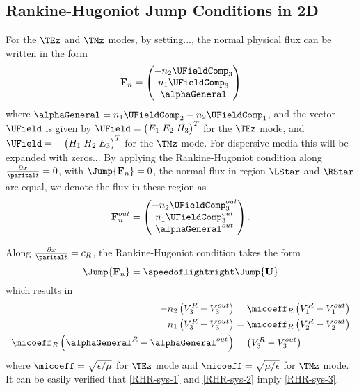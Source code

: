 \subsection{Rankine-Hugoniot Jump Conditions in 2D}
For the $\TEz$ and $\TMz$ modes, by setting..., the normal physical flux can be
written in the form
$$
\mathbf{F}_n = 
\begin{pmatrix}
  - n_2 \UFieldComp_3 \\
  n_1 \UFieldComp_3 \\
  \alphaGeneral
\end{pmatrix}
$$
where $ \alphaGeneral = n_1 \UFieldComp_2 - n_2 \UFieldComp_1 $, and the vector $\UField$ is given by $
\UField = 
  \begin{pmatrix} 
    E_1 \; E_2 \; H_3
  \end{pmatrix}^T
$ for the $\TEz$ mode, and $
\UField = 
  -
  \begin{pmatrix} 
    H_1 \; H_2 \; E_3
  \end{pmatrix}^T
  $ for the $\TMz$ mode.
For dispersive media this will be expanded with zeros...
By applying the Rankine-Hugoniot condition along $\frac{\partial x}{\parital t}
= 0$, with $ \Jump{ \mathbf{F}_n } = 0 $, the normal flux in region $\LStar$
and $\RStar$ are equal, we denote the flux in these region as
$$
\mathbf{F}_n^{out} = 
\begin{pmatrix}
  - n_2 \UFieldComp_3^{out} \\
  n_1 \UFieldComp_3^{out} \\
  \alphaGeneral^{out}
\end{pmatrix} .
$$

Along $\frac{\partial x}{\parital t} = c_R$, the Rankine-Hugoniot condition takes the form
$$
\Jump{ \mathbf{F}_n } = \speedoflightright \Jump{ \mathbf{U} }
$$
which results in
\begin{align}
-n_2 \left(V_3^{R} - V_3^{out} \right) &= \micoeff_R \left( V_1^{R} - V_1^{out} \right) \\ \label{RHR-sys-1}
n_1 \left(V_3^{R} - V_3^{out} \right) &= \micoeff_R  \left( V_2^{R} - V_2^{out} \right) \\  \label{RHR-sys-2}
\micoeff_R \left(\alphaGeneral^{R} - \alphaGeneral^{out} \right) &= \left( V_3^{R} - V_3^{out} \right) \label{RHR-sys-3}
\end{align}
where $\micoeff = \sqrt{\epsilon/\mu}$ for $\TEz$ mode and $\micoeff =
\sqrt{\mu/\epsilon}$ for $\TMz$ mode. It can be easily verified that
\eqref{RHR-sys-1} and \eqref{RHR-sys-2} imply \eqref{RHR-sys-3}.

